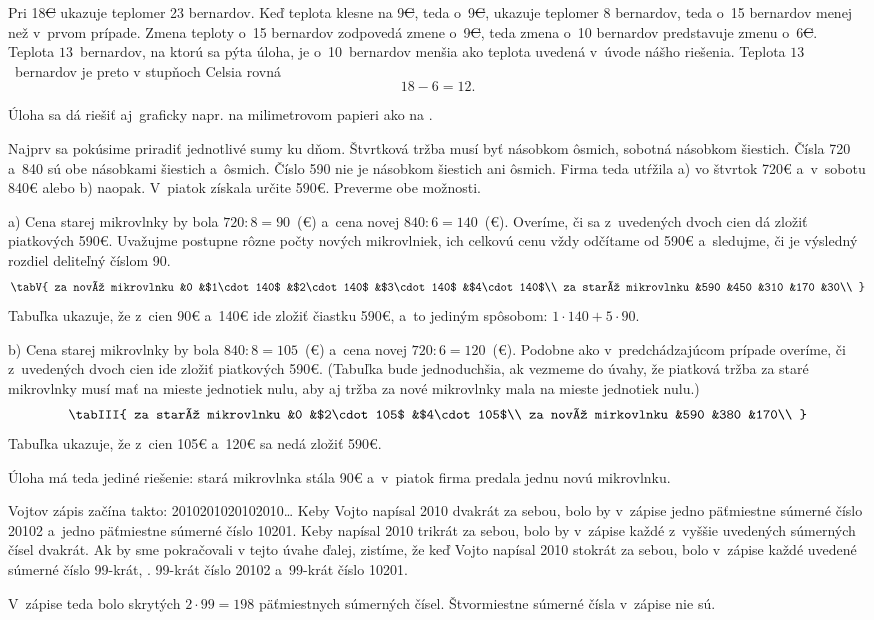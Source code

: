 {%
Pri 18\st{C} ukazuje teplomer 23 bernardov. Keď teplota klesne na 9\st{C}, teda
o~9\st{C}, ukazuje teplomer 8 bernardov, teda o~15 bernardov menej než v~prvom
prípade. Zmena teploty o~15 bernardov zodpovedá zmene o~9\st{C}, teda zmena o~10
bernardov predstavuje zmenu o~6\st{C}.
Teplota $13$~bernardov, na ktorú sa pýta úloha, je o~10~bernardov menšia ako teplota
uvedená v~úvode nášho riešenia. Teplota $13$~bernardov je preto v stupňoch
Celsia rovná
$$
18-6 = 12.
$$

\ineriesenie
Úloha sa dá riešiť aj~graficky napr. na milimetrovom papieri ako na \obr.
}

{%
Najprv sa pokúsime priradiť jednotlivé sumy ku dňom. Štvrtková tržba musí
byť násobkom ôsmich, sobotná násobkom šiestich. Čísla 720 a~840 sú obe násobkami
šiestich a~ôsmich. Číslo 590 nie je násobkom šiestich ani ôsmich. Firma teda
utŕžila a) vo štvrtok 720€ a~v~sobotu 840€ alebo b) naopak. V~piatok získala
určite 590€. Preverme obe možnosti.

\smallskip
a) Cena starej mikrovlnky by bola $720 : 8 = 90$~(\euro) a~cena novej $840 : 6 =
140$~(\euro). Overíme, či sa z~uvedených dvoch cien dá zložiť piatkových 590€.
Uvažujme postupne rôzne počty nových mikrovlniek, ich celkovú cenu vždy odčítame
od 590€ a~sledujme, či je výsledný rozdiel deliteľný číslom 90.
$$
\tabV{
za novú mikrovlnku &0 &$1\cdot140$ &$2\cdot140$ &$3\cdot140$ &$4\cdot140$\\
za starú mikrovlnku &590 &450 &310 &170 &30\\
}
$$
Tabuľka ukazuje, že z~cien 90€ a~140€ ide zložiť čiastku 590€, a~to
jediným spôsobom: $1\cdot140 + 5\cdot90$.

\smallskip
b) Cena starej mikrovlnky by bola $840 : 8 = 105$~(\euro) a~cena novej $720 : 6 =
120$~(\euro). Podobne ako v~predchádzajúcom prípade overíme, či z~uvedených
dvoch cien ide zložiť piatkových 590€. (Tabuľka bude jednoduchšia, ak vezmeme do úvahy,
že piatková tržba za staré mikrovlnky musí mať na mieste jednotiek nulu,
aby aj tržba za nové mikrovlnky mala na mieste jednotiek nulu.)
$$
\tabIII{
za starú mikrovlnku &0 &$2\cdot105$ &$4\cdot105$\\
za novú mirkovlnku &590 &380 &170\\
}
$$
Tabuľka ukazuje, že z~cien 105€ a~120€ sa nedá zložiť 590€.

Úloha má teda jediné riešenie: stará mikrovlnka stála 90€ a~v~piatok firma predala jednu novú mikrovlnku.
}

{%
Vojtov zápis začína takto: 2010201020102010\dots{}
Keby Vojto napísal 2010 dvakrát za sebou, bolo by v~zápise jedno päťmiestne súmerné
číslo 20102 a~jedno päťmiestne súmerné číslo 10201.
Keby napísal 2010 trikrát za sebou, bolo by v~zápise každé z~vyššie uvedených
súmerných čísel dvakrát.
Ak by sme pokračovali v tejto úvahe ďalej, zistíme, že
keď Vojto napísal 2010 stokrát za sebou, bolo v~zápise každé uvedené súmerné
číslo 99-krát, \tj. 99-krát číslo 20102 a~99-krát číslo 10201.

V~zápise teda bolo skrytých $2\cdot99=198$ päťmiestnych súmerných čísel.
Štvormiestne súmerné čísla v~zápise nie sú.
}

